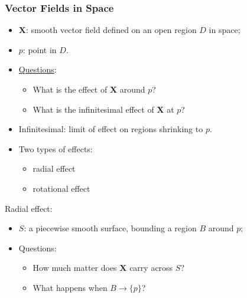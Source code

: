 \begin{frame}
  \frametitle{Vector Fields in Space}

  \begin{itemize}
    \item $\textbf{X}$: smooth vector field defined on an open region $D$ in space;
    \item $p$: point in $D$.
    \item \underline{Questions}:
    \begin{itemize}
      \item What is the effect of $\textbf{X}$ around $p$?
      \item What is the infinitesimal effect of $\textbf{X}$ at $p$?
    \end{itemize}
    \item Infinitesimal: limit of effect on regions shrinking to $p$.
    \item \pause Two types of effects:
    \begin{itemize}
      \item radial effect
      \item rotational effect
    \end{itemize}
  \end{itemize}

  \pause Radial effect:
  \begin{itemize}
    \item $S$: a piecewise smooth surface, bounding a region $B$ around $p$;
    \item Questions:
    \begin{itemize}
      \item How much matter does $\textbf{X}$ carry across $S$?
      \item What happens when $B \to \{p\}$?
    \end{itemize}
  \end{itemize}
\end{frame}